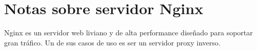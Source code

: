 
\chapter{Notas sobre servidor Nginx} %

\label{AppendixB} %

Nginx \citep{WEBSITE:36} es un servidor web liviano y de alta performance diseñado para soportar gran tráfico. Un de sus casos de uso es ser un servidor proxy inverso.


